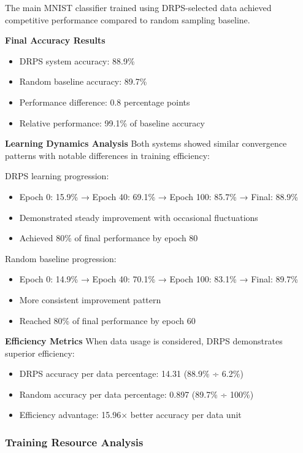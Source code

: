 \documentclass[12pt]{article}
\begin{document}
The main MNIST classifier trained using DRPS-selected data achieved competitive performance compared to random sampling baseline.

\textbf{Final Accuracy Results}
\begin{itemize}
\item DRPS system accuracy: 88.9\%
\item Random baseline accuracy: 89.7\%
\item Performance difference: 0.8 percentage points
\item Relative performance: 99.1\% of baseline accuracy
\end{itemize}

\textbf{Learning Dynamics Analysis}
Both systems showed similar convergence patterns with notable differences in training efficiency:

DRPS learning progression:
\begin{itemize}
\item Epoch 0: 15.9\% → Epoch 40: 69.1\% → Epoch 100: 85.7\% → Final: 88.9\%
\item Demonstrated steady improvement with occasional fluctuations
\item Achieved 80\% of final performance by epoch 80
\end{itemize}

Random baseline progression:
\begin{itemize}
\item Epoch 0: 14.9\% → Epoch 40: 70.1\% → Epoch 100: 83.1\% → Final: 89.7\%
\item More consistent improvement pattern
\item Reached 80\% of final performance by epoch 60
\end{itemize}

\textbf{Efficiency Metrics}
When data usage is considered, DRPS demonstrates superior efficiency:
\begin{itemize}
\item DRPS accuracy per data percentage: 14.31 (88.9\% ÷ 6.2\%)
\item Random accuracy per data percentage: 0.897 (89.7\% ÷ 100\%)
\item Efficiency advantage: 15.96× better accuracy per data unit
\end{itemize}

\subsubsection{Training Resource Analysis}\label{resource-analysis}
\end{document}
